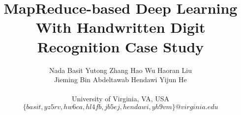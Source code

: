 \documentclass[conference]{IEEEtran}
\begin{document}
\title{MapReduce-based Deep Learning With Handwritten Digit Recognition Case Study}
\author{
Nada Basit\hspace*{0.07in}
Yutong Zhang\hspace*{0.07in}
Hao Wu\hspace*{0.07in}
Haoran Liu\hspace*{0.07in}\\
Jieming Bin\hspace*{0.07in}
Abdeltawab Hendawi\hspace*{0.07in}
Yijun He\hspace*{0.07in}
\\~\\
\fontsize{10}{10}\selectfont\ttfamily\upshape
University of Virginia, VA, USA\\
\fontsize{9}{9}\selectfont\ttfamily\itshape
$\{basit, yz5rv, hw6ca, hl4fb, jb5ej, hendawi, yh9vm\}@virginia.edu$
\\~\\
}

\maketitle














%
%


\end{document}
